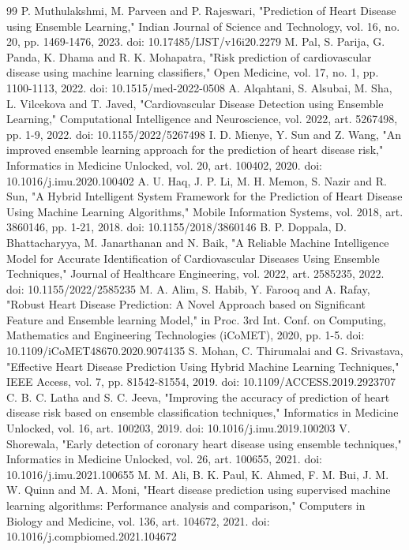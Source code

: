 \documentclass[runningheads]{llncs}
\begin{document}
\begin{thebibliography}{99}
 P. Muthulakshmi, M. Parveen and P. Rajeswari, "Prediction of Heart Disease using Ensemble Learning," Indian Journal of Science and Technology, vol. 16, no. 20, pp. 1469-1476, 2023. doi: 10.17485/IJST/v16i20.2279
 M. Pal, S. Parija, G. Panda, K. Dhama and R. K. Mohapatra, "Risk prediction of cardiovascular disease using machine learning classifiers," Open Medicine, vol. 17, no. 1, pp. 1100-1113, 2022. doi: 10.1515/med-2022-0508
 A. Alqahtani, S. Alsubai, M. Sha, L. Vilcekova and T. Javed, "Cardiovascular Disease Detection using Ensemble Learning," Computational Intelligence and Neuroscience, vol. 2022, art. 5267498, pp. 1-9, 2022. doi: 10.1155/2022/5267498
 I. D. Mienye, Y. Sun and Z. Wang, "An improved ensemble learning approach for the prediction of heart disease risk," Informatics in Medicine Unlocked, vol. 20, art. 100402, 2020. doi: 10.1016/j.imu.2020.100402
 A. U. Haq, J. P. Li, M. H. Memon, S. Nazir and R. Sun, "A Hybrid Intelligent System Framework for the Prediction of Heart Disease Using Machine Learning Algorithms," Mobile Information Systems, vol. 2018, art. 3860146, pp. 1-21, 2018. doi: 10.1155/2018/3860146
 B. P. Doppala, D. Bhattacharyya, M. Janarthanan and N. Baik, "A Reliable Machine Intelligence Model for Accurate Identification of Cardiovascular Diseases Using Ensemble Techniques," Journal of Healthcare Engineering, vol. 2022, art. 2585235, 2022. doi: 10.1155/2022/2585235
 M. A. Alim, S. Habib, Y. Farooq and A. Rafay, "Robust Heart Disease Prediction: A Novel Approach based on Significant Feature and Ensemble learning Model," in Proc. 3rd Int. Conf. on Computing, Mathematics and Engineering Technologies (iCoMET), 2020, pp. 1-5. doi: 10.1109/iCoMET48670.2020.9074135
 S. Mohan, C. Thirumalai and G. Srivastava, "Effective Heart Disease Prediction Using Hybrid Machine Learning Techniques," IEEE Access, vol. 7, pp. 81542-81554, 2019. doi: 10.1109/ACCESS.2019.2923707
 C. B. C. Latha and S. C. Jeeva, "Improving the accuracy of prediction of heart disease risk based on ensemble classification techniques," Informatics in Medicine Unlocked, vol. 16, art. 100203, 2019. doi: 10.1016/j.imu.2019.100203
 V. Shorewala, "Early detection of coronary heart disease using ensemble techniques," Informatics in Medicine Unlocked, vol. 26, art. 100655, 2021. doi: 10.1016/j.imu.2021.100655
 M. M. Ali, B. K. Paul, K. Ahmed, F. M. Bui, J. M. W. Quinn and M. A. Moni, "Heart disease prediction using supervised machine learning algorithms: Performance analysis and comparison," Computers in Biology and Medicine, vol. 136, art. 104672, 2021. doi: 10.1016/j.compbiomed.2021.104672

\end{thebibliography}
\end{document}
